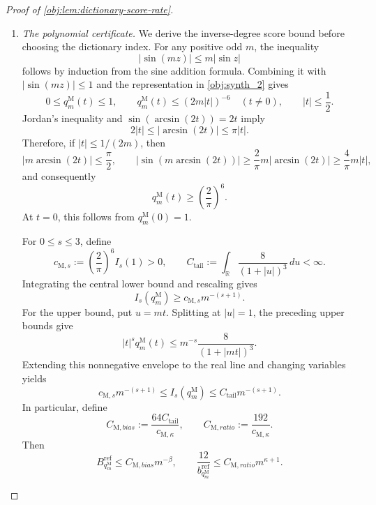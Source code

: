 \documentclass[11pt]{article}
\begin{document}
\begin{proof}[Proof of \cref{obj:lem:dictionary-score-rate}]
\begin{enumerate}
\item \emph{The polynomial certificate.}
We derive the inverse-degree score bound before choosing the dictionary index. For any positive odd \(m\), the inequality
\[
|\sin(mz)|\le m|\sin z|
\]
follows by induction from the sine addition formula. Combining it with
\(|\sin(mz)|\le1\) and the representation in \cref{obj:synth_2} gives
\[
0\le q_m^{\mathrm M}(t)\le1,
\qquad
q_m^{\mathrm M}(t)\le(2m|t|)^{-6}\quad(t\ne0),
\qquad |t|\le\frac12.
\]
Jordan's inequality and \(\sin(\arcsin(2t))=2t\) imply
\[
2|t|\le|\arcsin(2t)|\le\pi|t|.
\]
Therefore, if \(|t|\le1/(2m)\), then
\[
|m\arcsin(2t)|\le\frac\pi2,
\qquad
|\sin(m\arcsin(2t))|
\ge\frac2\pi m|\arcsin(2t)|
\ge\frac4\pi m|t|,
\]
and consequently
\[
q_m^{\mathrm M}(t)\ge\left(\frac2\pi\right)^6.
\]
At \(t=0\), this follows from \(q_m^{\mathrm M}(0)=1\).

For \(0\le s\le3\), define
\[
c_{\mathrm M,s}:=\left(\frac2\pi\right)^6I_s(1)>0,
\qquad
C_{\mathrm{tail}}:=\int_{\mathbb R}\frac8{(1+|u|)^3}\,du<\infty.
\]
Integrating the central lower bound and rescaling gives
\[
I_s(q_m^{\mathrm M})\ge c_{\mathrm M,s}m^{-(s+1)}.
\]
For the upper bound, put \(u=mt\). Splitting at \(|u|=1\), the preceding upper bounds give
\[
|t|^s q_m^{\mathrm M}(t)
\le m^{-s}\frac8{(1+|mt|)^3}.
\]
Extending this nonnegative envelope to the real line and changing variables yields
\[
c_{\mathrm M,s}m^{-(s+1)}
\le I_s(q_m^{\mathrm M})
\le C_{\mathrm{tail}}m^{-(s+1)}.
\]
In particular, define
\[
C_{\mathrm M,bias}:=\frac{64C_{\mathrm{tail}}}{c_{\mathrm M,\kappa}},
\qquad
C_{\mathrm M,ratio}:=\frac{192}{c_{\mathrm M,\kappa}}.
\]
Then
\[
B_{q_m^{\mathrm M}}^{\mathrm{ref}}\le C_{\mathrm M,bias}m^{-\beta},
\qquad
\frac{12}{b_{q_m^{\mathrm M}}^{\mathrm{ref}}}
\le C_{\mathrm M,ratio}m^{\kappa+1}.
\]


\end{enumerate}
\end{proof}
\end{document}
